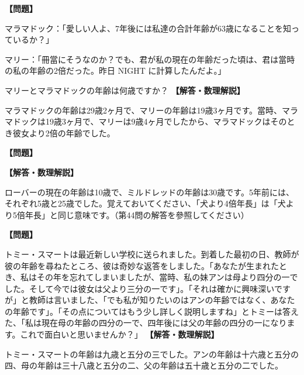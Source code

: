 \documentclass[10pt,a4paper,oneside,openany]{ltjsbook}
\begin{document}
\begin{tcolorbox}[colback=softblue,colframe=primaryblue,title=\textbf{第 46 問：マリーとマラマドック （原題: MARY AND MARMADUKE.）},arc=2mm,boxrule=1pt,breakable]
\textbf{【問題】}\par\vspace{0.3em}
マラマドック：「愛しい人よ、7年後には私達の合計年齢が63歳になることを知っているか？」

マリー：「冊當にそうなのか？でも、君が私の現在の年齢だった頃は、君は當時の私の年齢の2倍だった。昨日 NIGHT に計算したんだよ。」

マリーとマラマドックの年齢は何歳ですか？
\tcblower
\textbf{【解答・数理解説】}\par\vspace{0.3em}
マラマドックの年齢は29歳2ヶ月で、マリーの年齢は19歳3ヶ月です。當時、マラマドックは19歳3ヶ月で、マリーは9歳4ヶ月でしたから、マラマドックはそのとき彼女より2倍の年齢でした。
\end{tcolorbox}

\begin{tcolorbox}[colback=softblue,colframe=primaryblue,title=\textbf{第 47 問：ローバーの年齢 （原題: ROVER'S AGE.）},arc=2mm,boxrule=1pt,breakable]
\textbf{【問題】}\par\vspace{0.3em}

\tcblower
\textbf{【解答・数理解説】}\par\vspace{0.3em}
ローバーの現在の年齢は10歳で、ミルドレッドの年齢は30歳です。5年前には、それぞれ5歳と25歳でした。覚えておいてください、「犬より4倍年長」は「犬より5倍年長」と同じ意味です。（第44問の解答を參照してください）
\end{tcolorbox}

\begin{tcolorbox}[colback=softblue,colframe=primaryblue,title=\textbf{第 48 問：トミーの年齢について （原題: CONCERNING TOMMY'S AGE.）},arc=2mm,boxrule=1pt,breakable]
\textbf{【問題】}\par\vspace{0.3em}
トミー・スマートは最近新しい学校に送られました。到着した最初の日、教師が彼の年齢を尋ねたところ、彼は奇妙な返答をしました。「あなたが生まれたとき、私はその年を忘れてしまいましたが、當時、私の妹アンは母より四分の一でした。そして今では彼女は父より三分の一です」。「それは確かに興味深いですが」と教師は言いました、「でも私が知りたいのはアンの年齢ではなく、あなたの年齢です」。「その点についてはもう少し詳しく説明しますね」とトミーは答えた、「私は現在母の年齢の四分の一で、四年後には父の年齢の四分の一になります。これで面白いと思いませんか？」
\tcblower
\textbf{【解答・数理解説】}\par\vspace{0.3em}
トミー・スマートの年齢は九歳と五分の三でした。アンの年齢は十六歳と五分の四、母の年齢は三十八歳と五分の二、父の年齢は五十歳と五分の二でした。
\end{tcolorbox}
\end{document}
